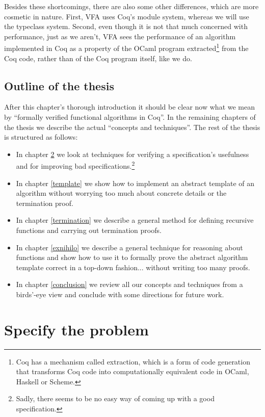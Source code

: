 \documentclass[declaration,mgr,english,shortabstract]{iithesis}
\begin{document}
Besides these shortcomings, there are also some other differences, which are more cosmetic in nature. First, VFA uses Coq's module system, whereas we will use the typeclass system. Second, even though it is not that much concerned with performance, just as we aren't, VFA sees the performance of an algorithm implemented in Coq as a property of the OCaml program extracted\footnote{Coq has a mechanism called extraction, which is a form of code generation that transforms Coq code into computationally equivalent code in OCaml, Haskell or Scheme.} from the Coq code, rather than of the Coq program itself, like we do.

\section{Outline of the thesis} \label{outline}

After this chapter's thorough introduction it should be clear now what we mean by ``formally verified functional algorithms in Coq''. In the remaining chapters of the thesis we describe the actual ``concepts and techniques''. The rest of the thesis is structured as follows:

\begin{itemize}
    \setlength\itemsep{0em}
    \item In chapter \ref{specify} we look at techniques for verifying a specification's usefulness and for improving bad specifications.\footnote{Sadly, there seems to be no easy way of coming up with a good specification.}
    \item In chapter \ref{template} we show how to implement an abstract template of an algorithm without worrying too much about concrete details or the termination proof.
    \item In chapter \ref{termination} we describe a general method for defining recursive functions and carrying out termination proofs.
    \item In chapter \ref{exnihilo} we describe a general technique for reasoning about functions and show how to use it to formally prove the abstract algorithm template correct in a top-down fashion... without writing too many proofs.
    \item In chapter \ref{conclusion} we review all our concepts and techniques from a birds'-eye view and conclude with some directions for future work.
\end{itemize}

\chapter{Specify the problem} \label{specify}
\end{document}
